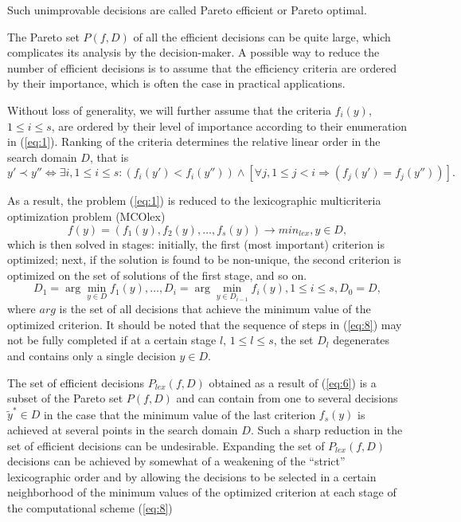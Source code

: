 \documentclass[smallextended]{svjour3}       %
\begin{document}
Such unimprovable decisions are called Pareto efficient or Pareto optimal.

The Pareto set $P(f,D)$ of all the efficient decisions can be quite large, which complicates its analysis by the decision-maker. A possible way to reduce the number of efficient decisions is to assume that the efficiency criteria are ordered by their importance, which is often the case in practical applications.

Without loss of generality, we will further assume that the criteria $f_i(y)$, $1 \leq i \leq s$, are ordered by their level of importance according to their enumeration in (\ref{eq:1}). Ranking of the criteria determines the relative linear order in the search domain $D$, that is
\begin{equation}\label{eq:6}
y' \prec y'' \Leftrightarrow \exists i, 1 \leq i \leq s: (f_i(y')<f_i(y'')) \wedge [ \forall j, 1 \leq j <i \Rightarrow (f_j(y')=f_j(y'')) ].
\end{equation}

As a result, the problem (\ref{eq:1}) is reduced to the lexicographic multicriteria optimization problem (MCOlex)
\begin{equation}\label{eq:7}
f(y) = (f_1(y), f_2(y), \dots , f_s(y)) \to min_{lex},  y \in D,
\end{equation}
which is then solved in stages: initially, the first (most important) criterion is optimized; next, if the solution is found to be non-unique, the second criterion is optimized on the set of solutions of the first stage, and so on.
\begin{equation}\label{eq:8}
D_1=\arg \min_{y \in D}{f_1(y)},\dots, D_i=\arg \min_{y \in D_{i-1}}{f_i(y)},1 \leq i \leq s,D_0=D,
\end{equation}
where $arg$ is the set of all decisions that achieve the minimum value of the optimized criterion. It should be noted that the sequence of steps in (\ref{eq:8}) may not be fully completed if at a certain stage $l$, $1 \leq l \leq s$, the set $D_l$ degenerates and contains only a single decision $y \in D$.

The set of efficient decisions $P_{lex}(f,D)$ obtained as a result of (\ref{eq:6}) is a subset of the Pareto set $P(f,D)$ and can contain from one to several decisions $\widetilde{y}^* \in D$ in the case that the minimum value of the last criterion $f_s(y)$ is achieved at several points in the search domain $D$. Such a sharp reduction in the set of efficient decisions can be undesirable. Expanding the set of $P_{lex}(f,D)$ decisions can be achieved by somewhat of a weakening of the ``strict'' lexicographic order and by allowing the decisions to be selected in a certain neighborhood of the minimum values of the optimized criterion at each stage of the computational scheme (\ref{eq:8})
\end{document}
